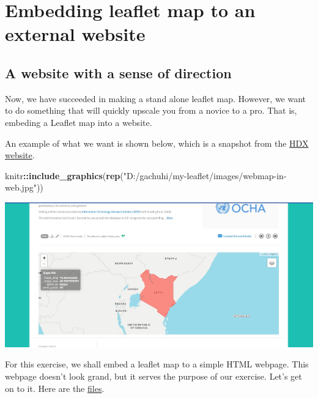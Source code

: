 \documentclass[
]{book}
\newenvironment{Shaded}{\begin{snugshade}}{\end{snugshade}}
\newcommand{\FunctionTok}[1]{\textcolor[rgb]{0.13,0.29,0.53}{\textbf{#1}}}
\newcommand{\NormalTok}[1]{#1}
\newcommand{\SpecialCharTok}[1]{\textcolor[rgb]{0.81,0.36,0.00}{\textbf{#1}}}
\newcommand{\StringTok}[1]{\textcolor[rgb]{0.31,0.60,0.02}{#1}}
\begin{document}
\hypertarget{embedding-leaflet-map-to-an-external-website}{%
\chapter{Embedding leaflet map to an external website}\label{embedding-leaflet-map-to-an-external-website}}

\hypertarget{a-website-with-a-sense-of-direction}{%
\section{A website with a sense of direction}\label{a-website-with-a-sense-of-direction}}

Now, we have succeeded in making a stand alone leaflet map. However, we want to do something that will quickly upscale you from a novice to a pro. That is, embeding a Leaflet map into a website.

An example of what we want is shown below, which is a snapshot from the \href{https://data.humdata.org/dataset/cod-ab-ken}{HDX website}.

\begin{Shaded}
\begin{Highlighting}[]
\NormalTok{knitr}\SpecialCharTok{::}\FunctionTok{include\_graphics}\NormalTok{(}\FunctionTok{rep}\NormalTok{(}\StringTok{"D:/gachuhi/my{-}leaflet/images/webmap{-}in{-}web.jpg"}\NormalTok{))}
\end{Highlighting}
\end{Shaded}

\includegraphics{../images/webmap-in-web.jpg}

For this exercise, we shall embed a leaflet map to a simple HTML webpage. This webpage doesn't look grand, but it serves the purpose of our exercise. Let's get on to it. Here are the \href{https://github.com/sammigachuhi/my-leaflet-project/tree/main/my-leaflet-code/chapter-4-embed-leaflet-website}{files}.
\end{document}
